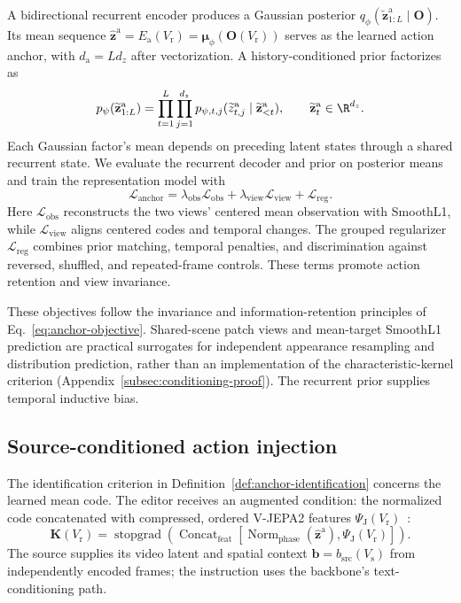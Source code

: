 A bidirectional recurrent encoder produces a Gaussian posterior
$q_\phi(\widetilde{\mathbf z}^{\mathrm a}_{1:L}\mid \mathbf O)$. Its mean sequence $\widehat{\mathbf z}^{\mathrm a}=E_{\mathrm a}(V_{\mathrm r})=\boldsymbol\mu_\phi(\mathbf O(V_{\mathrm r}))$ serves as the
learned action anchor, with $d_{\mathrm a}=Ld_z$ after vectorization. A history-conditioned prior factorizes as
\begin{equation}
 p_\psi(\widetilde{\mathbf z}^{\mathrm a}_{1:L})
 =\prod_{t=1}^{L}\prod_{j=1}^{d_z}
   p_{\psi,t,j}(\widetilde z^{\mathrm a}_{t,j}\mid \widetilde{\mathbf z}^{\mathrm a}_{<t}),\qquad \widetilde{\mathbf z}^{\mathrm a}_t\in\R^{d_z}.
 \label{eq:method-action-prior}
\end{equation}
Each Gaussian factor's mean depends on preceding latent states through a
shared recurrent state. We evaluate the recurrent decoder and prior on
posterior means and train the representation model with
\begin{equation}
 \mathcal L_{\mathrm{anchor}}
 =\lambda_{\mathrm{obs}}\mathcal L_{\mathrm{obs}}
  +\lambda_{\mathrm{view}}\mathcal L_{\mathrm{view}}
  +\mathcal L_{\mathrm{reg}}.
 \label{eq:method-anchor-loss}
\end{equation}
Here $\mathcal L_{\mathrm{obs}}$ reconstructs the two views' centered mean
observation with SmoothL1, while $\mathcal L_{\mathrm{view}}$ aligns centered
codes and temporal changes. The grouped regularizer $\mathcal L_{\mathrm{reg}}$
combines prior matching, temporal penalties, and discrimination against
reversed, shuffled, and repeated-frame controls. These terms promote
action retention and view invariance.

These objectives follow the invariance and information-retention principles
of Eq.~\ref{eq:anchor-objective}. Shared-scene patch views and mean-target
SmoothL1 prediction are practical surrogates for independent appearance
resampling and distribution prediction, rather than an implementation of
the characteristic-kernel criterion
(Appendix~\ref{subsec:conditioning-proof}).
The recurrent prior supplies temporal inductive bias.

\subsection{Source-conditioned action injection}
\label{subsec:method-editing}

The identification criterion in Definition~\ref{def:anchor-identification}
concerns the learned mean code. The editor receives an augmented condition:
the normalized code concatenated with compressed, ordered V-JEPA2 features
$\Psi_{\mathrm J}(V_{\mathrm r})$~\citep{assran2025vjepa2}:
\begin{equation}
 \mathbf K(V_{\mathrm r})=\operatorname{stopgrad}\!\left(
  \operatorname{Concat}_{\mathrm{feat}}\!\left[
    \operatorname{Norm}_{\mathrm{phase}}(\widehat{\mathbf z}^{\mathrm a}),
    \Psi_{\mathrm J}(V_{\mathrm r})\right]\right).
 \label{eq:method-action-condition}
\end{equation}
The source supplies its video latent and spatial context
$\mathbf b=b_{\mathrm{src}}(V_{\mathrm s})$ from independently encoded frames; the instruction
uses the backbone's text-conditioning path.

